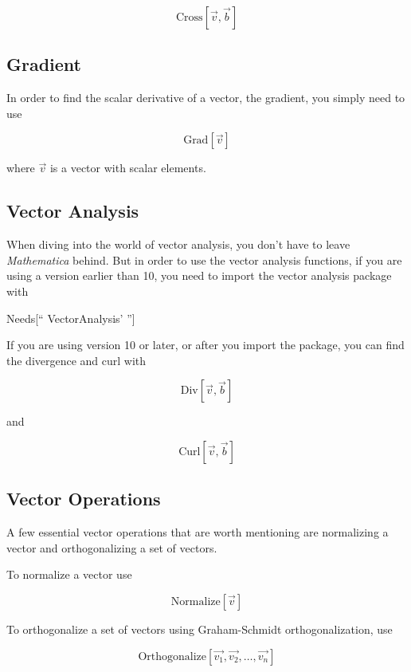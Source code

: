 \documentclass[11pt,letterpaper,twoside,titlepage]{report}
\newcommand{\Mathematica}{\textit{Mathematica} }
\begin{document}
					\[ \text{Cross} [ \vec{v}, \vec{b} ] \]
					
				\subsection{Gradient}
				
					In order to find the scalar derivative of a vector, the gradient, you simply need to use 
					
					\[ \text{Grad}[\vec{v}] \]
					
					where $\vec{v}$ is a vector with scalar elements.
					
				\subsection{Vector Analysis}
				
					When diving into the world of vector analysis, you don't have to leave \Mathematica behind.  But in order to use the vector analysis functions, if you are using a version earlier than 10, you need to import the vector analysis package with
					
					\begin{center}
					
						Needs[`` VectorAnalysis' '']
					
					\end{center}
					
					If you are using version 10 or later, or after you import the package, you can find the divergence and curl with 
					
					\[ \text{Div}[ \vec{v}, \vec{b} ] \]
					
					and 
					
					\[ \text{Curl}[ \vec{v}, \vec{b} ] \]
					
				\subsection{Vector Operations}
				
					A few essential vector operations that are worth mentioning are normalizing a vector and orthogonalizing a set of vectors.
					
					To normalize a vector use
					
					\[ \text{Normalize}[ \vec{v} ] \]
					
					To orthogonalize a set of vectors using Graham-Schmidt orthogonalization, use 
					
					\[ \text{Orthogonalize}[ \vec{v_1}, \vec{v_2}, \dots, \vec{v_n} ] \]
						
\end{document}
